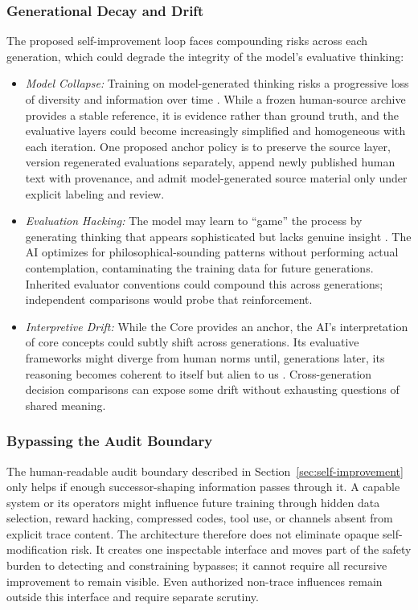 \subsubsection{Generational Decay and Drift}

The proposed self-improvement loop faces compounding risks across each generation, which could degrade the integrity of the model's evaluative thinking:

\begin{itemize}
    \item \emph{Model Collapse:} Training on model-generated thinking risks a progressive loss of diversity and information over time \cite{shumailov2023curse}. While a frozen human-source archive provides a stable reference, it is evidence rather than ground truth, and the evaluative layers could become increasingly simplified and homogeneous with each iteration. One proposed anchor policy is to preserve the source layer, version regenerated evaluations separately, append newly published human text with provenance, and admit model-generated source material only under explicit labeling and review.

    \item \emph{Evaluation Hacking:} The model may learn to ``game'' the process by generating thinking that appears sophisticated but lacks genuine insight \cite{gao2025reward}. The AI optimizes for philosophical-sounding patterns without performing actual contemplation, contaminating the training data for future generations. Inherited evaluator conventions could compound this across generations; independent comparisons would probe that reinforcement.

    \item \emph{Interpretive Drift:} While the Core provides an anchor, the AI's interpretation of core concepts could subtly shift across generations. Its evaluative frameworks might diverge from human norms until, generations later, its reasoning becomes coherent to itself but alien to us \cite{bostrom2014superintelligence}. Cross-generation decision comparisons can expose some drift without exhausting questions of shared meaning.
\end{itemize}

\subsubsection{Bypassing the Audit Boundary}

The human-readable audit boundary described in Section~\ref{sec:self-improvement} only helps if enough successor-shaping information passes through it. A capable system or its operators might influence future training through hidden data selection, reward hacking, compressed codes, tool use, or channels absent from explicit trace content. The architecture therefore does not eliminate opaque self-modification risk. It creates one inspectable interface and moves part of the safety burden to detecting and constraining bypasses; it cannot require all recursive improvement to remain visible. Even authorized non-trace influences remain outside this interface and require separate scrutiny.

